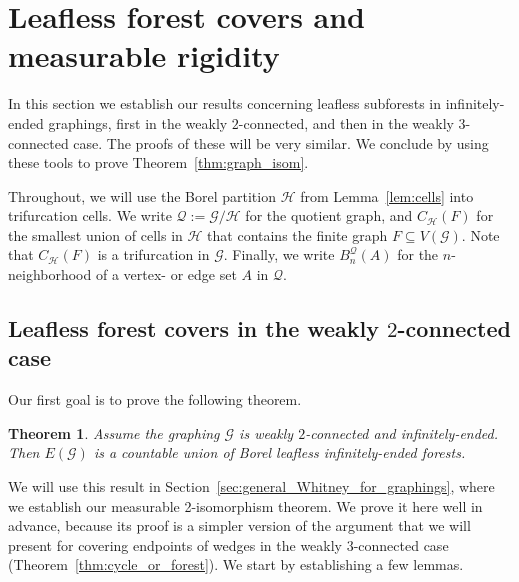 \documentclass{article}
\theoremstyle{plain}
\newtheorem{thm}{Theorem}[section]
\theoremstyle{definition}
\newcommand{\cG}{\mathcal{G}}
\newcommand{\cQ}{\mathcal{Q}}
\newcommand{\cH}{\mathcal{H}}
\begin{document}
\section{Leafless forest covers and measurable rigidity}\label{sec:cycle_forest_cover}
In this section we establish our results concerning leafless subforests in infinitely-ended graphings, first in the weakly $2$-connected, and then in the weakly $3$-connected case. The proofs of these will be very similar. We conclude by using these tools to prove Theorem~\ref{thm:graph_isom}. 

Throughout, we will use the Borel partition $\cH$ from Lemma~\ref{lem:cells} into trifurcation cells. We write $\cQ:=\cG/\cH$ for the quotient graph, and $C_\cH(F)$ for the smallest union of cells in $\cH$ that contains the finite graph $F\subseteq V(\cG)$. Note that $C_\cH(F)$ is a trifurcation in $\cG$. Finally, we write $B_n^{\cQ}(A)$ for the $n$-neighborhood of a vertex- or edge set $A$ in $\cQ$. 

\subsection{Leafless forest covers in the weakly $2$-connected case}

Our first goal is to prove the following theorem. 
\begin{thm}\label{thm:union_of_inf_ended_leafless}
    Assume the graphing $\cG$ is weakly $2$-connected and infinitely-ended. Then $E(\cG)$ is a countable union of Borel leafless infinitely-ended forests.
\end{thm}

We will use this result in Section~\ref{sec:general_Whitney_for_graphings}, where we establish our measurable 2-isomorphism theorem. We prove it here well in advance, because its proof is a simpler version of the argument that we will present for covering endpoints of wedges in the weakly $3$-connected case (Theorem~\ref{thm:cycle_or_forest}). We start by establishing a few lemmas.
\end{document}
